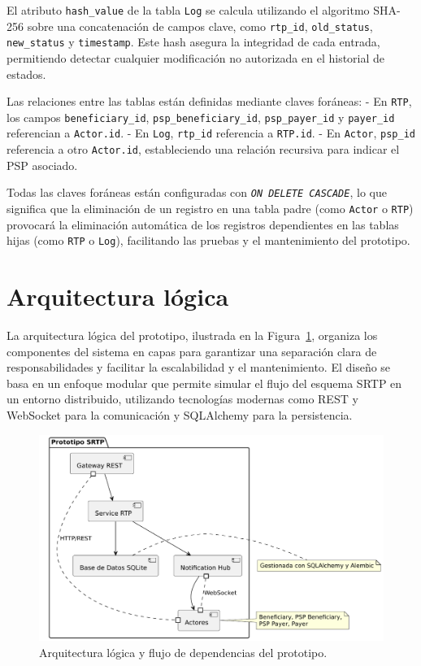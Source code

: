 El atributo \texttt{hash\_value} de la tabla \texttt{Log} se calcula utilizando el algoritmo SHA-256 sobre una concatenación de campos clave, como \texttt{rtp\_id}, \texttt{old\_status}, \texttt{new\_status} y \texttt{timestamp}. Este hash asegura la integridad de cada entrada, permitiendo detectar cualquier modificación no autorizada en el historial de estados.

Las relaciones entre las tablas están definidas mediante claves foráneas:
- En \texttt{RTP}, los campos \texttt{beneficiary\_id}, \texttt{psp\_beneficiary\_id}, \texttt{psp\_payer\_id} y \texttt{payer\_id} referencian a \texttt{Actor.id}.
- En \texttt{Log}, \texttt{rtp\_id} referencia a \texttt{RTP.id}.
- En \texttt{Actor}, \texttt{psp\_id} referencia a otro \texttt{Actor.id}, estableciendo una relación recursiva para indicar el PSP asociado.

Todas las claves foráneas están configuradas con \emph{\texttt{ON DELETE CASCADE}}, lo que significa que la eliminación de un registro en una tabla padre (como \texttt{Actor} o \texttt{RTP}) provocará la eliminación automática de los registros dependientes en las tablas hijas (como \texttt{RTP} o \texttt{Log}), facilitando las pruebas y el mantenimiento del prototipo.


\section{Arquitectura lógica}
\label{subsec:diseno_arquitectura}

La arquitectura lógica del prototipo, ilustrada en la Figura~\ref{fig:componentes}, organiza los componentes del sistema en capas para garantizar una separación clara de responsabilidades y facilitar la escalabilidad y el mantenimiento. El diseño se basa en un enfoque modular que permite simular el flujo del esquema SRTP en un entorno distribuido, utilizando tecnologías modernas como REST y WebSocket para la comunicación y SQLAlchemy para la persistencia.

\begin{figure}[htbp]
  \centering
  \includegraphics[width=.85\textwidth]{Imagenes/DiagComp.pdf}
  \caption{Arquitectura lógica y flujo de dependencias del prototipo.}
  \label{fig:componentes}
\end{figure}

